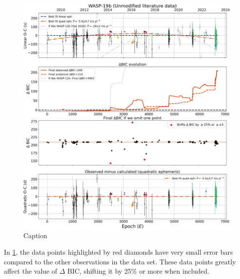 \documentclass[oneside,12pt]{amsart}
\numberwithin{page}{section}
\begin{document}
\begin{figure}[htbp]
    \centering
    \includegraphics[width=\linewidth]{figs/adams_fig4.jpg}
    \caption{Caption}
    \label{fig:adams-fig4}
\end{figure}

In \ref{fig:adams-fig4}, the data points highlighted by red diamonds have very small error bars compared to the other observations in the data set. These data points greatly affect the value of $\Delta$ BIC, shifting it by 25\% or more when included.


\end{document}
